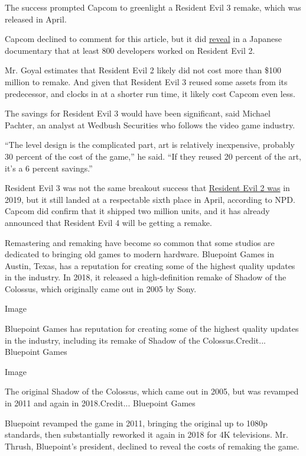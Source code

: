 The success prompted Capcom to greenlight a Resident Evil 3 remake,
which was released in April.

Capcom declined to comment for this article, but it did
\href{https://comicbook.com/gaming/news/resident-evil-2-remake-dev-team-size-over-800/}{reveal}
in a Japanese documentary that at least 800 developers worked on
Resident Evil 2.

Mr. Goyal estimates that Resident Evil 2 likely did not cost more than
\$100 million to remake. And given that Resident Evil 3 reused some
assets from its predecessor, and clocks in at a shorter run time, it
likely cost Capcom even less.

The savings for Resident Evil 3 would have been significant, said
Michael Pachter, an analyst at Wedbush Securities who follows the video
game industry.

``The level design is the complicated part, art is relatively
inexpensive, probably 30 percent of the cost of the game,'' he said.
``If they reused 20 percent of the art, it's a 6 percent savings.''

Resident Evil 3 was not the same breakout success that
\href{https://venturebeat.com/2019/02/20/january-2019-npd-sales-down-as-kingdom-hearts-tops-charts/}{Resident
Evil 2 was} in 2019, but it still landed at a respectable sixth place in
April, according to NPD. Capcom did confirm that it shipped two million
units, and it has already announced that Resident Evil 4 will be getting
a remake.

Remastering and remaking have become so common that some studios are
dedicated to bringing old games to modern hardware. Bluepoint Games in
Austin, Texas, has a reputation for creating some of the highest quality
updates in the industry. In 2018, it released a high-definition remake
of Shadow of the Colossus, which originally came out in 2005 by Sony.

Image

Bluepoint Games has reputation for creating some of the highest quality
updates in the industry, including its remake of Shadow of the
Colossus.Credit... Bluepoint Games

Image

The original Shadow of the Colossus, which came out in 2005, but was
revamped in 2011 and again in 2018.Credit... Bluepoint Games

Bluepoint revamped the game in 2011, bringing the original up to 1080p
standards, then substantially reworked it again in 2018 for 4K
televisions. Mr. Thrush, Bluepoint's president, declined to reveal the
costs of remaking the game.

